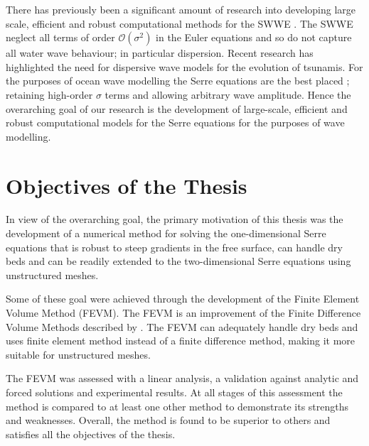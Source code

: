 There has previously been a significant amount of research into developing large scale, efficient and robust computational methods for the SWWE \cite{ClawPack,Comcot,ANUGA}. The SWWE neglect all terms of order $\mathcal{O}\left(\sigma ^2\right)$ in the Euler equations and so do not capture all water wave behaviour; in particular dispersion. Recent research \cite{Grue-etal-2008-113,Kirby-etal-2013-39} has highlighted the need for dispersive wave models for the evolution of tsunamis. For the purposes of ocean wave modelling the Serre equations are the best placed \cite{Bonneton-Lannes-2009-16601}; retaining high-order $\sigma$ terms and allowing arbitrary wave amplitude. Hence the overarching goal of our research is the development of large-scale, efficient and robust computational models for the Serre equations for the purposes of wave modelling.

\section{Objectives of the Thesis}
In view of the overarching goal, the primary motivation of this thesis was the development of a numerical method for solving the one-dimensional Serre equations that is robust to steep gradients in the free surface, can handle dry beds and can be readily extended to the two-dimensional Serre equations using unstructured meshes. 

Some of these goal were achieved through the development of the Finite Element Volume Method (FEVM). The FEVM is an improvement of the Finite Difference Volume Methods described by \citet{Zoppou-2014}. The FEVM can adequately handle dry beds and uses finite element method instead of a finite difference method, making it more suitable for unstructured meshes. 

The FEVM was assessed with a linear analysis, a validation against analytic and forced solutions and experimental results. At all stages of this assessment the method is compared to at least one other method to demonstrate its strengths and weaknesses. Overall, the method is found to be superior to others and satisfies all the objectives of the thesis.

